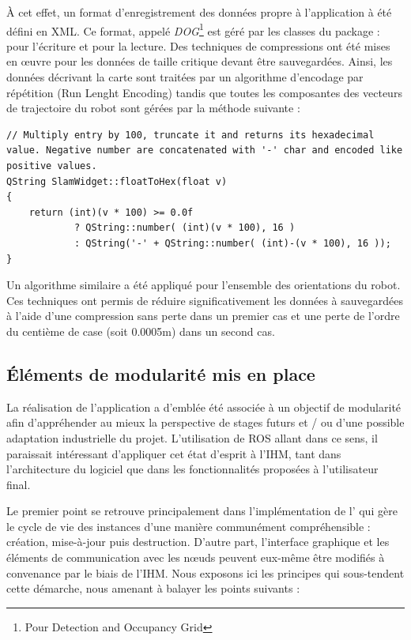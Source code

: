 \`{A} cet effet, un format d'enregistrement des données propre à l'application à été défini en \gls{XML}.
Ce format, appelé \emph{DOG}\footnote{Pour Detection and Occupancy Grid} est géré par les classes du package  :  pour l'écriture et  pour la lecture. 
Des techniques de compressions ont été mises en \oe{}uvre pour les données de taille critique devant être sauvegardées. 
Ainsi, les données décrivant la carte sont traitées par un algorithme d'encodage par répétition (Run Lenght Encoding) tandis que toutes les composantes des vecteurs de trajectoire du robot sont gérées par la méthode suivante :

\begin{lstlisting}[style=customcpp]
// Multiply entry by 100, truncate it and returns its hexadecimal value. Negative number are concatenated with '-' char and encoded like positive values.
QString SlamWidget::floatToHex(float v)
{
    return (int)(v * 100) >= 0.0f
            ? QString::number( (int)(v * 100), 16 )
            : QString('-' + QString::number( (int)-(v * 100), 16 ));
}
\end{lstlisting}

Un algorithme similaire a été appliqué pour l'ensemble des orientations du robot. 
Ces techniques ont permis de réduire significativement les données à sauvegardées à l'aide d'une compression sans perte dans un  premier cas et une perte de l'ordre du centième de case (soit 0.0005m) dans un second cas.  
  
  \subsection{\'{E}léments de modularité mis en place}
  
La réalisation de l'application a d'emblée été associée à un objectif de modularité afin d'appréhender au mieux la perspective de stages futurs et / ou d'une possible adaptation industrielle du projet. 
L'utilisation de ROS allant dans ce sens, il paraissait intéressant d'appliquer cet état d'esprit à l'\gls{IHM}, tant dans l'architecture du logiciel que dans les fonctionnalités proposées à l'utilisateur final. 

Le premier point se retrouve principalement dans l'implémentation de l' qui gère le cycle de vie des instances d'une manière communément compréhensible : création, mise-à-jour puis destruction.  
D'autre part, l'interface graphique et les éléments de communication avec les n\oe{}uds peuvent eux-même être modifiés à convenance par le biais de l'\gls{IHM}. 
Nous exposons ici les principes qui sous-tendent cette démarche, nous amenant à balayer les points suivants : 

